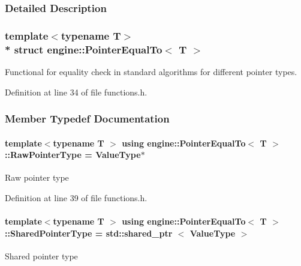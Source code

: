 \subsubsection{Detailed Description}
\subsubsection*{template$<$typename T$>$\\*
struct engine\+::\+Pointer\+Equal\+To$<$ T $>$}

Functional for equality check in standard algorithms for different pointer types. 

Definition at line 34 of file functions.\+h.



\subsubsection{Member Typedef Documentation}
\paragraph[{\texorpdfstring{Raw\+Pointer\+Type}{RawPointerType}}]{\setlength{\rightskip}{0pt plus 5cm}template$<$typename T $>$ using {\bf engine\+::\+Pointer\+Equal\+To}$<$ T $>$\+::{\bf Raw\+Pointer\+Type} =  {\bf Value\+Type}$\ast$}\hypertarget{a00062_accdf0f2f7684859c103e277bc745f869}{}\label{a00062_accdf0f2f7684859c103e277bc745f869}
Raw pointer type 

Definition at line 39 of file functions.\+h.

\paragraph[{\texorpdfstring{Shared\+Pointer\+Type}{SharedPointerType}}]{\setlength{\rightskip}{0pt plus 5cm}template$<$typename T $>$ using {\bf engine\+::\+Pointer\+Equal\+To}$<$ T $>$\+::{\bf Shared\+Pointer\+Type} =  std\+::shared\+\_\+ptr $<$ {\bf Value\+Type} $>$}\hypertarget{a00062_a30718c9509a5f19766f8d867ddd08011}{}\label{a00062_a30718c9509a5f19766f8d867ddd08011}
Shared pointer type 

